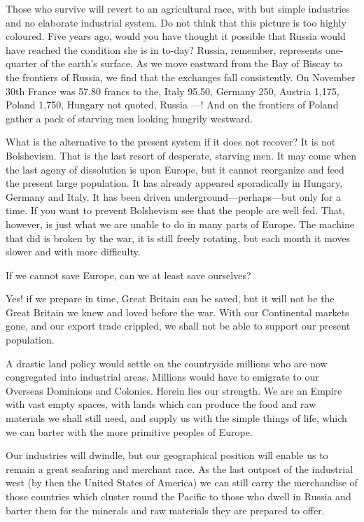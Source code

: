 \documentclass{book}
\begin{document}
Those who survive will revert to an agricultural race, with but simple industries and no elaborate industrial system. Do not think that this picture is too highly coloured. Five years ago, would you have thought it possible that Russia would have reached the condition she is in to-day? Russia, remember, represents one-quarter of the earth’s surface. As we move eastward from the Bay of Biscay to the frontiers of Russia, we find that the exchanges fall consistently. On November 30th France was 57.80 francs to the, Italy 95.50, Germany 250, Austria 1,175, Poland 1,750, Hungary not quoted, Russia —! And on the frontiers of Poland gather a pack of starving men looking hungrily westward.

What is the alternative to the present system if it does not recover? It is not Bolshevism. That is the last resort of desperate, starving men. It may come when the last agony of dissolution is upon Europe, but it cannot reorganize and feed the present large population. It has already appeared sporadically in Hungary, Germany and Italy. It has been driven underground—perhaps—but only for a time. If you want to prevent Bolshevism see that the people are well fed. That, however, is just what we are unable to do in many parts of Europe. The machine that did is broken by the war, it is still freely rotating, but each month it moves slower and with more difficulty.

If we cannot save Europe, can we at least save ourselves?

Yes! if we prepare in time, Great Britain can be saved, but it will not be the Great Britain we knew and loved before the war. With our Continental markets gone, and our export trade crippled, we shall not be able to support our present population.

A drastic land policy would settle on the countryside millions who are now congregated into industrial areas. Millions would have to emigrate to our Overseas Dominions and Colonies. Herein lies our strength. We are an Empire with vast empty spaces, with lands which can produce the food and raw materials we shall still need, and supply us with the simple things of life, which we can barter with the more primitive peoples of Europe.

Our industries will dwindle, but our geographical position will enable us to remain a great seafaring and merchant race. As the last outpost of the industrial west (by then the United States of America) we can still carry the merchandise of those countries which cluster round the Pacific to those who dwell in Russia and barter them for the minerals and raw materials they are prepared to offer.
\end{document}
